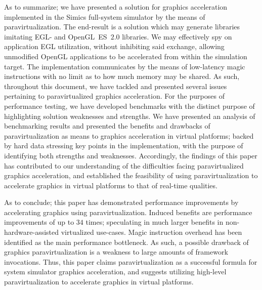 As to summarize; we have presented a solution for graphics acceleration implemented in the Simics full-system simulator by the means of paravirtualization.
The end-result is a solution which may generate libraries imitating EGL- and OpenGL~ES~$2.0$ libraries.
We may effectively spy on application EGL utilization, without inhibiting said exchange, allowing unmodified OpenGL applications to be accelerated from within the simulation target.
The implementation communicates by the means of low-latency magic instructions with no limit as to how much memory may be shared.
As such, throughout this document, we have tackled and presented several issues pertaining to paravirtualized graphics acceleration.
For the purposes of performance testing, we have developed benchmarks with the distinct purpose of highlighting solution weaknesses and strengths.
We have presented an analysis of benchmarking results and presented the benefits and drawbacks of paravirtualization as means to graphics acceleration in virtual platforms; backed by hard data stressing key points in the implementation, with the purpose of identifying both strengths and weaknesses.
Accordingly, the findings of this paper has contributed to our understanding of the difficulties facing paravirtualized graphics acceleration, and established the feasibility of using paravirtualization to accelerate graphics in virtual platforms to that of real-time qualities.

As to conclude; this paper has demonstrated performance improvements by accelerating graphics using paravirtualization.
Induced benefits are performance improvements of up to $34$ times; speculating in much larger benefits in non-hardware-assisted virtualized use-cases.
Magic instruction overhead has been identified as the main performance bottleneck.
As such, a possible drawback of graphics paravirtualization is a weakness to large amounts of framework invocations.
Thus, this paper claims paravirtualization as a successful formula for system simulator graphics acceleration, and suggests utilizing high-level paravirtualization to accelerate graphics in virtual platforms.

